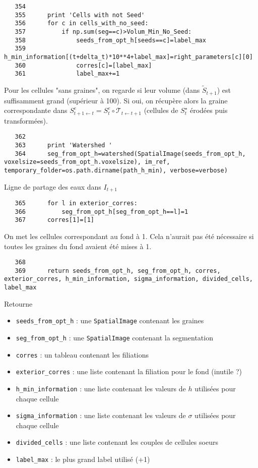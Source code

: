 \documentclass{article}
\def \mycolor {red}
\begin{document}
\color{black}
\begin{verbatim}
   354	
   355	    print 'Cells with not Seed'
   356	    for c in cells_with_no_seed:
   357	        if np.sum(seg==c)>Volum_Min_No_Seed:
   358	            seeds_from_opt_h[seeds==c]=label_max
   359	            h_min_information[(t+delta_t)*10**4+label_max]=right_parameters[c][0]
   360	            corres[c]=[label_max]
   361	            label_max+=1
\end{verbatim} 
\color{\mycolor}
Pour les cellules "sans graines", on regarde si leur volume (dans $\tilde{S}_{t+1}$) est suffisamment grand (sup\'erieur \`a 100). Si oui, on r\'ecup\`ere alors la graine correspondante dans $S^e_{t+1 \leftarrow t} = S^e_t \circ \mathcal{T}_{t \leftarrow t+1}$ (cellules de $S^{\star}_t$ \'erod\'ees puis transform\'ees).
\color{black}
\begin{verbatim}
   362	
   363	    print 'Watershed '
   364	    seg_from_opt_h=watershed(SpatialImage(seeds_from_opt_h, voxelsize=seeds_from_opt_h.voxelsize), im_ref, temporary_folder=os.path.dirname(path_h_min), verbose=verbose)
\end{verbatim} 
\color{\mycolor}
Ligne de partage des eaux dans $I_{t+1}$
\color{black}
\begin{verbatim}
   365	    for l in exterior_corres:
   366	        seg_from_opt_h[seg_from_opt_h==l]=1
   367	    corres[1]=[1]
\end{verbatim} 
\color{\mycolor}
On met les cellules correspondant au fond \`a 1. Cela n'aurait pas \'et\'e n\'ecessaire si toutes les graines du fond avaient \'et\'e mises \`a 1.
\color{black}
\begin{verbatim}
   368	
   369	    return seeds_from_opt_h, seg_from_opt_h, corres, exterior_corres, h_min_information, sigma_information, divided_cells, label_max    
\end{verbatim}
\color{\mycolor}
Retourne
\begin{itemize}
\itemsep -0.5ex
\item \verb|seeds_from_opt_h| : une \texttt{SpatialImage} contenant les graines
\item \verb|seg_from_opt_h| : une \texttt{SpatialImage} contenant la segmentation
\item \verb|corres| : un tableau contenant les filiations
\item \verb|exterior_corres| : une liste contenant la filiation pour le fond (inutile ?)
\item \verb|h_min_information| : une liste contenant les valeurs de $h$ utilisées pour chaque cellule
\item \verb|sigma_information| : une liste contenant les valeurs de $\sigma$ utilisées pour chaque cellule
\item \verb|divided_cells| : une liste contenant les couples de cellules soeurs
\item \verb|label_max| : le plus grand label utilisé (+1)
\end{itemize}
\color{black}
\end{document}
